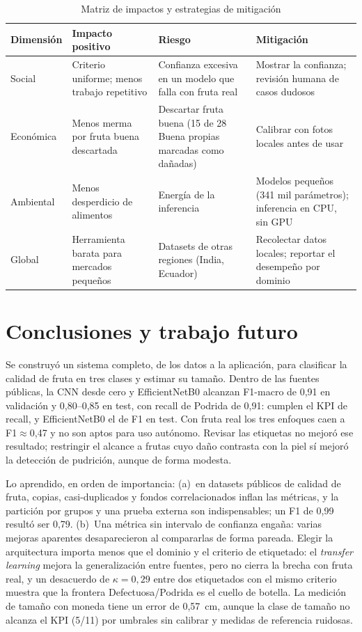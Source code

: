 \documentclass[conference,a4paper]{IEEEtran}
\begin{document}
\begin{table}[t]
\caption{Matriz de impactos y estrategias de mitigación}
\label{tab:impactos}
\centering\footnotesize
\begin{tabular}{@{}p{1.7cm}p{4.2cm}p{5.0cm}p{5.5cm}@{}}
\toprule
Dimensión & Impacto positivo & Riesgo & Mitigación \\
\midrule
Social & Criterio uniforme; menos trabajo repetitivo & Confianza excesiva en un modelo que falla con fruta real & Mostrar la confianza; revisión humana de casos dudosos \\
Económica & Menos merma por fruta buena descartada & Descartar fruta buena (15 de 28 Buena propias marcadas como dañadas) & Calibrar con fotos locales antes de usar \\
Ambiental & Menos desperdicio de alimentos \cite{fao2019,unep2021} & Energía de la inferencia & Modelos pequeños (341 mil parámetros); inferencia en CPU, sin GPU \\
Global & Herramienta barata para mercados pequeños & Datasets de otras regiones (India, Ecuador) & Recolectar datos locales; reportar el desempeño por dominio \\
\bottomrule
\end{tabular}
\end{table}

\section{Conclusiones y trabajo futuro}

Se construyó un sistema completo, de los datos a la aplicación, para clasificar la calidad de fruta en
tres clases y estimar su tamaño. Dentro de las fuentes públicas, la CNN desde cero y EfficientNetB0
alcanzan F1-macro de 0,91 en validación y 0,80--0,85 en test, con recall de Podrida de 0,91: cumplen
el KPI de recall, y EfficientNetB0 el de F1 en test. Con fruta real los tres enfoques caen a
F1$\approx$0,47 y no son aptos para uso autónomo. Revisar las etiquetas no mejoró ese resultado;
restringir el alcance a frutas cuyo daño contrasta con la piel sí mejoró la detección de pudrición,
aunque de forma modesta.

Lo aprendido, en orden de importancia: (a)~en datasets públicos de calidad de fruta, copias,
casi-duplicados y fondos correlacionados inflan las métricas, y la partición por grupos y una prueba
externa son indispensables; un F1 de 0,99 resultó ser 0,79. (b)~Una métrica sin intervalo de
confianza engaña: varias mejoras aparentes desaparecieron al compararlas de forma pareada. Elegir la arquitectura importa menos que el dominio y el criterio de etiquetado: el
\emph{transfer learning} mejora la generalización entre fuentes, pero no cierra la brecha con fruta
real, y un desacuerdo de $\kappa=0{,}29$ entre dos etiquetados con el mismo criterio muestra que la
frontera Defectuosa/Podrida es el cuello de botella. La medición de tamaño con moneda tiene un error de 0,57~cm, aunque la clase de tamaño no alcanza
el KPI (5/11) por umbrales sin calibrar y medidas de referencia ruidosas.
\end{document}
